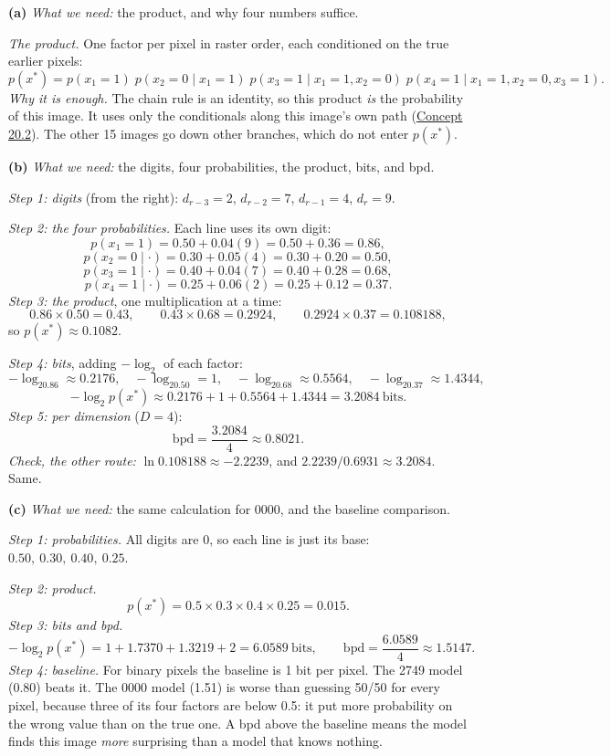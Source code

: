 \documentclass[12pt,a4paper]{article}
\begin{document}
\textbf{(a)} \emph{What we need:} the product, and why four numbers suffice.

\emph{The product.} One factor per pixel in raster order, each conditioned on the true earlier pixels:
\[
p(x^*)=p(x_1=1)\;p(x_2=0\mid x_1=1)\;p(x_3=1\mid x_1=1,x_2=0)\;p(x_4=1\mid x_1=1,x_2=0,x_3=1).
\]
\emph{Why it is enough.} The chain rule is an identity, so this product \emph{is} the probability of this image. It uses only the conditionals along this image's own path (\hyperref[c20-2]{Concept 20.2}). The other 15 images go down other branches, which do not enter $p(x^*)$.

\textbf{(b)} \emph{What we need:} the digits, four probabilities, the product, bits, and bpd.

\emph{Step 1: digits} (from the right): $d_{r-3}=2$, $d_{r-2}=7$, $d_{r-1}=4$, $d_r=9$.

\emph{Step 2: the four probabilities.} Each line uses its own digit:
\[
p(x_1=1)=0.50+0.04(9)=0.50+0.36=0.86,
\]
\[
p(x_2=0\mid\cdot)=0.30+0.05(4)=0.30+0.20=0.50,
\]
\[
p(x_3=1\mid\cdot)=0.40+0.04(7)=0.40+0.28=0.68,
\]
\[
p(x_4=1\mid\cdot)=0.25+0.06(2)=0.25+0.12=0.37 .
\]
\emph{Step 3: the product}, one multiplication at a time:
\[
0.86\times0.50=0.43,\qquad 0.43\times0.68=0.2924,\qquad 0.2924\times0.37=0.108188,
\]
so $p(x^*)\approx0.1082$.

\emph{Step 4: bits}, adding $-\log_2$ of each factor:
\[
-\log_20.86\approx0.2176,\quad -\log_20.50=1,\quad -\log_20.68\approx0.5564,\quad -\log_20.37\approx1.4344,
\]
\[
-\log_2p(x^*)\approx0.2176+1+0.5564+1.4344=3.2084\ \text{bits}.
\]
\emph{Step 5: per dimension} ($D=4$):
\[
\text{bpd}=\frac{3.2084}{4}\approx0.8021 .
\]
\emph{Check, the other route:} $\ln0.108188\approx-2.2239$, and $2.2239/0.6931\approx3.2084$. Same.

\textbf{(c)} \emph{What we need:} the same calculation for 0000, and the baseline comparison.

\emph{Step 1: probabilities.} All digits are 0, so each line is just its base: $0.50,\ 0.30,\ 0.40,\ 0.25$.

\emph{Step 2: product.}
\[
p(x^*)=0.5\times0.3\times0.4\times0.25=0.015 .
\]
\emph{Step 3: bits and bpd.}
\[
-\log_2p(x^*)=1+1.7370+1.3219+2=6.0589\ \text{bits},\qquad \text{bpd}=\frac{6.0589}{4}\approx1.5147 .
\]
\emph{Step 4: baseline.} For binary pixels the baseline is 1 bit per pixel. The 2749 model (0.80) beats it. The 0000 model (1.51) is worse than guessing 50/50 for every pixel, because three of its four factors are below 0.5: it put more probability on the wrong value than on the true one. A bpd above the baseline means the model finds this image \emph{more} surprising than a model that knows nothing.
\end{document}
